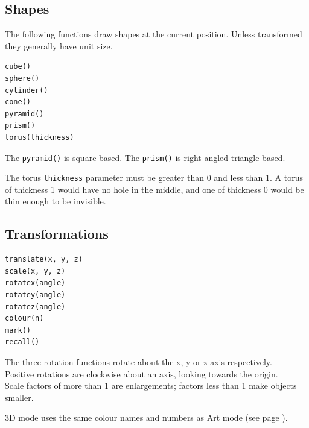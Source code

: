 \documentclass[12pt,a4paper,twoside]{article}
\renewcommand{\_}{\texttt{\symbol{95}}}
\begin{document}
\subsection{Shapes}

The following functions draw shapes at the current position.
Unless transformed they generally have unit size.

\begin{verbatim}
cube()
sphere()
cylinder()
cone()
pyramid()
prism()
torus(thickness)
\end{verbatim}

The \verb^pyramid()^ is square-based. The \verb^prism()^ is right-angled
triangle-based.

The torus \verb^thickness^ parameter
must be greater than 0 and less than 1. A torus of thickness 1 would
have no hole in the middle, and one of thickness 0 would be thin enough to be
invisible.

\subsection{Transformations}

\begin{verbatim}
translate(x, y, z)
scale(x, y, z)
rotatex(angle)
rotatey(angle)
rotatez(angle)
colour(n)
mark()
recall()
\end{verbatim}

The three rotation functions rotate about the x, y or z axis respectively.\\
Positive rotations are clockwise about an axis, looking towards the origin.\\
Scale factors of more than 1 are enlargements; factors less than 1 make
objects smaller.


3D mode uses the same colour names and numbers as Art mode (see page \pageref{roboc:colours}).
%
%
%
%
\end{document}
